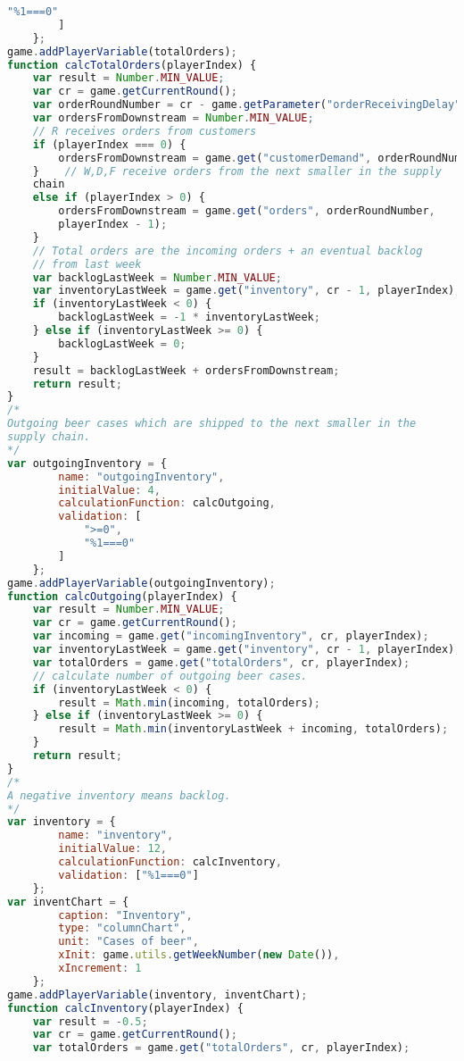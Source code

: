 \begin{lstlisting}[language=Javascript, caption=Game code of the beergame, label=lst:beergame]
            "%1===0"
        ]
    };
game.addPlayerVariable(totalOrders);
function calcTotalOrders(playerIndex) {
    var result = Number.MIN_VALUE;
    var cr = game.getCurrentRound();
    var orderRoundNumber = cr - game.getParameter("orderReceivingDelay");
    var ordersFromDownstream = Number.MIN_VALUE;
    // R receives orders from customers    
    if (playerIndex === 0) {
        ordersFromDownstream = game.get("customerDemand", orderRoundNumber);
    }    // W,D,F receive orders from the next smaller in the supply
    chain
    else if (playerIndex > 0) {
        ordersFromDownstream = game.get("orders", orderRoundNumber,
        playerIndex - 1);
    }
    // Total orders are the incoming orders + an eventual backlog
    // from last week
    var backlogLastWeek = Number.MIN_VALUE;
    var inventoryLastWeek = game.get("inventory", cr - 1, playerIndex);
    if (inventoryLastWeek < 0) {
        backlogLastWeek = -1 * inventoryLastWeek;
    } else if (inventoryLastWeek >= 0) {
        backlogLastWeek = 0;
    }
    result = backlogLastWeek + ordersFromDownstream;
    return result;
}
/*
Outgoing beer cases which are shipped to the next smaller in the
supply chain.
*/
var outgoingInventory = {
        name: "outgoingInventory",
        initialValue: 4,
        calculationFunction: calcOutgoing,
        validation: [
            ">=0",
            "%1===0"
        ]
    };
game.addPlayerVariable(outgoingInventory);
function calcOutgoing(playerIndex) {
    var result = Number.MIN_VALUE;
    var cr = game.getCurrentRound();
    var incoming = game.get("incomingInventory", cr, playerIndex);
    var inventoryLastWeek = game.get("inventory", cr - 1, playerIndex);
    var totalOrders = game.get("totalOrders", cr, playerIndex);
    // calculate number of outgoing beer cases. 
    if (inventoryLastWeek < 0) {
        result = Math.min(incoming, totalOrders);
    } else if (inventoryLastWeek >= 0) {
        result = Math.min(inventoryLastWeek + incoming, totalOrders);
    }
    return result;
}
/*
A negative inventory means backlog.
*/
var inventory = {
        name: "inventory",
        initialValue: 12,
        calculationFunction: calcInventory,
        validation: ["%1===0"]
    };
var inventChart = {
        caption: "Inventory",
        type: "columnChart",
        unit: "Cases of beer",
        xInit: game.utils.getWeekNumber(new Date()),
        xIncrement: 1
    };
game.addPlayerVariable(inventory, inventChart);
function calcInventory(playerIndex) {
    var result = -0.5;
    var cr = game.getCurrentRound();
    var totalOrders = game.get("totalOrders", cr, playerIndex);

\end{lstlisting}

